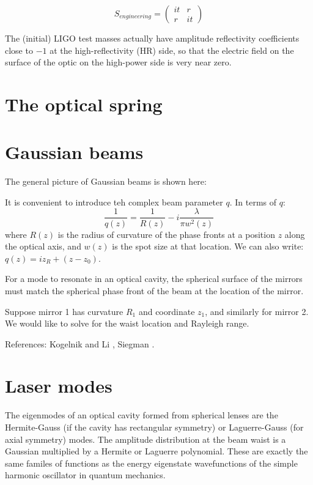 \[
S_{engineering}=\left(\begin{array}{cc}
it & r\\
r & it
\end{array}\right)
\]

The (initial) LIGO test masses actually have amplitude reflectivity
coefficients close to $-1$ at the high-reflectivity (HR) side, so
that the electric field on the surface of the optic on the high-power
side is very near zero.%

\section{The optical spring}



\section{Gaussian beams}

The general picture of Gaussian beams is shown here:

It is convenient to introduce teh complex beam parameter $q$.  In terms of $q$:
\begin{equation}
\frac{1}{q(z)} = \frac{1}{R(z)} - i \frac{\lambda}{\pi w^2(z)}
\end{equation}
where $R(z)$ is the radius of curvature of the phase fronts at a
position $z$ along the optical axis, and $w(z)$ is the spot size at
that location.  We can also write:
$q(z) = i z_R + (z - z_0)$.

For a mode to resonate in an optical cavity, the spherical surface of
the mirrors must match the spherical phase front of the beam at the
location of the mirror.

Suppose mirror 1 has curvature $R_1$ and coordinate $z_1$, and
similarly for mirror 2.  We would like to solve for the waist location
and Rayleigh range.

References: Kogelnik and Li \cite{Kogelnik1966Laser}, Siegman \cite{Siegman1990Lasers}.

\section{Laser modes}

The eigenmodes of an optical cavity formed from spherical lenses are
the Hermite-Gauss (if the cavity has rectangular symmetry) or
Laguerre-Gauss (for axial symmetry) modes.  The amplitude distribution
at the beam waist is a Gaussian multiplied by a Hermite or Laguerre
polynomial.  These are exactly the same familes of functions as the
energy eigenstate wavefunctions of the simple harmonic oscillator in
quantum mechanics.

